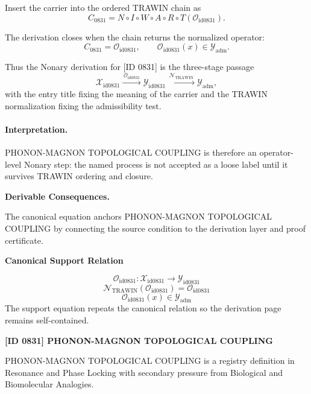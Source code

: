 Insert the carrier into the ordered TRAWIN chain as\[
C_{0831}=N\circ I\circ W\circ A\circ R\circ T(\mathcal{O}_{\mathrm{id0831}}).
\]

The derivation closes when the chain returns the normalized operator:\[
C_{0831}=\mathcal{O}_{\mathrm{id0831}},\qquad \mathcal{O}_{\mathrm{id0831}}(x)\in\mathcal{Y}_{\mathrm{adm}}.
\]

Thus the Nonary derivation for [ID 0831] is the three-stage passage
\[
\mathcal{X}_{\mathrm{id0831}}\xrightarrow{\,\mathcal{O}_{\mathrm{id0831}}\,} \mathcal{Y}_{\mathrm{id0831}}\xrightarrow{\,\mathcal{N}_{\mathrm{TRAWIN}}\,} \mathcal{Y}_{\mathrm{adm}},
\]
with the entry title fixing the meaning of the carrier and the TRAWIN normalization fixing the admissibility test.

\paragraph{Interpretation.} PHONON-MAGNON TOPOLOGICAL COUPLING is therefore an operator-level Nonary step: the named process is not accepted as a loose label until it survives TRAWIN ordering and closure.

\par\vspace{0.35em}
\noindent\textbf{Derivable Consequences.}\quad
\begingroup
\footnotesize
\raggedright
The canonical equation anchors PHONON-MAGNON TOPOLOGICAL COUPLING by connecting the source condition to the derivation layer and proof certificate.
\par\endgroup

\noindent\textbf{Canonical Support Relation}\par
\[
\mathcal{O}_{\mathrm{id0831}}:\mathcal{X}_{\mathrm{id0831}}\longrightarrow\mathcal{Y}_{\mathrm{id0831}}
\]
\[
\mathcal{N}_{\mathrm{TRAWIN}}(\mathcal{O}_{\mathrm{id0831}})=\mathcal{O}_{\mathrm{id0831}}
\]
\[
\mathcal{O}_{\mathrm{id0831}}(x)\in\mathcal{Y}_{\mathrm{adm}}
\]
\noindent The support equation repeats the canonical relation so the derivation page remains self-contained.\par

\clearpage
\noindent\textbf{[ID 0831] PHONON-MAGNON TOPOLOGICAL COUPLING}\par
\vspace{0.35em}
\begingroup\small
{}
PHONON-MAGNON TOPOLOGICAL COUPLING is a registry definition in Resonance and Phase Locking with secondary pressure from Biological and Biomolecular Analogies.

